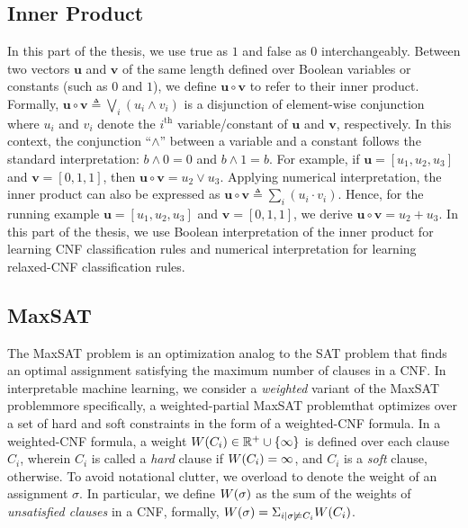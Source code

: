 \subsection*{Inner Product}
In this part of the thesis, we use true as $ 1 $ and false as $ 0 $ interchangeably. Between two vectors  $\mathbf{u}$ and $\mathbf{v}$ of the same length defined over Boolean variables or constants (such as  $ 0 $ and $ 1 $), we define $\mathbf{u} \circ \mathbf{v} $  to refer to  their inner product. Formally, $\mathbf{u} \circ \mathbf{v} \triangleq \bigvee_{i} (u_{i} \wedge v_{i})$ is a disjunction of element-wise conjunction where $u_{i}$ and $v_{i}$ denote the $ i^\text{th} $ variable/constant of $\mathbf{u}$ and $\mathbf{v}$, respectively. In this context, the conjunction ``$\wedge$'' between a variable and a constant follows the standard interpretation: $b \wedge 0 = 0$ and $b \wedge 1 = b$.  For example, if $ \mathbf{u} = [u_1, u_2, u_3] $ and $ \mathbf{v} = [0,1,1] $, then $ \mathbf{u} \circ \mathbf{v} = u_2 \vee u_3 $. Applying numerical interpretation, the inner product can also be expressed as $\mathbf{u} \circ \mathbf{v} \triangleq \sum_{i} (u_{i} \cdot v_{i}) $. Hence, for the running example $ \mathbf{u} = [u_1, u_2, u_3] $ and $ \mathbf{v} = [0,1,1] $, we derive $ \mathbf{u} \circ \mathbf{v} = u_2  + u_3 $. In this part of the thesis, we use Boolean interpretation of the inner product for learning CNF classification rules and numerical interpretation for learning relaxed-CNF classification rules.




\subsection*{MaxSAT}

The MaxSAT problem is an optimization analog to the SAT problem that finds an optimal assignment satisfying the maximum number of clauses in a CNF. In interpretable machine learning, we consider a \emph{weighted} variant of the MaxSAT problem\textemdash more specifically, a weighted-partial MaxSAT problem\textemdash that optimizes over a set of hard and soft constraints in the form of a weighted-CNF formula. In a weighted-CNF formula, a weight $ {W \! \left( C_i \right)} \in \mathbb{R}^+ \cup \{\infty\} $ is defined over each clause $ C_i $, wherein $C_i$ is called a \emph{hard} clause if $W \! \left( C_i \right) = \infty$, and  $C_i$ is  a \emph{soft} clause, otherwise.  To avoid notational clutter, we overload {\weight{\cdot}} to denote the weight of an assignment $ \sigma $. In particular, we define $W \! \left( \sigma \right)$ as the sum of the weights of \emph{unsatisfied clauses} in a CNF, formally, $W \! \left( \sigma \right) = \Sigma_{i | \sigma \not \models C_i} W \! \left( C_i \right)$.


